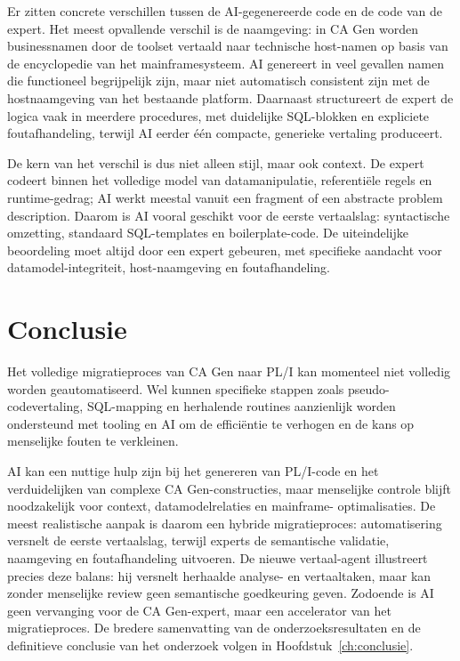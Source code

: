 Er zitten concrete verschillen tussen de AI-gegenereerde code en de code
van de expert. Het meest opvallende verschil is de naamgeving: in CA Gen
worden businessnamen door de toolset vertaald naar technische host-namen
op basis van de encyclopedie van het mainframesysteem. AI genereert in
veel gevallen namen die functioneel begrijpelijk zijn, maar niet
automatisch consistent zijn met de hostnaamgeving van het bestaande
platform. Daarnaast structureert de expert de logica vaak in meerdere
procedures, met duidelijke SQL-blokken en expliciete foutafhandeling,
terwijl AI eerder één compacte, generieke vertaling produceert.

De kern van het verschil is dus niet alleen stijl, maar ook context. De
expert codeert binnen het volledige model van datamanipulatie,
referentiële regels en runtime-gedrag; AI werkt meestal vanuit een
fragment of een abstracte problem description. Daarom is AI vooral geschikt
voor de eerste vertaalslag: syntactische omzetting, standaard SQL-templates
en boilerplate-code. De uiteindelijke beoordeling moet altijd door een
expert gebeuren, met specifieke aandacht voor datamodel-integriteit,
host-naamgeving en foutafhandeling.

\section{Conclusie}
\label{sec:automatisatie-conclusie}

Het volledige migratieproces van CA Gen naar PL/I kan momenteel niet
volledig worden geautomatiseerd. Wel kunnen specifieke stappen zoals
pseudo-codevertaling, SQL-mapping en herhalende routines aanzienlijk
worden ondersteund met tooling en AI om de efficiëntie te verhogen en de
kans op menselijke fouten te verkleinen.

AI kan een nuttige hulp zijn bij het genereren van PL/I-code en het
verduidelijken van complexe CA Gen-constructies, maar menselijke controle
blijft noodzakelijk voor context, datamodelrelaties en mainframe-
optimalisaties. De meest realistische aanpak is daarom een hybride
migratieproces: automatisering versnelt de eerste vertaalslag, terwijl
experts de semantische validatie, naamgeving en foutafhandeling uitvoeren.
De nieuwe vertaal-agent illustreert precies deze balans: hij versnelt
herhaalde analyse- en vertaaltaken, maar kan zonder menselijke review geen
semantische goedkeuring geven. Zodoende is AI geen vervanging voor de CA
Gen-expert, maar een accelerator van het migratieproces. De bredere
samenvatting van de onderzoeksresultaten en de definitieve conclusie van het
onderzoek volgen in Hoofdstuk~\ref{ch:conclusie}.

